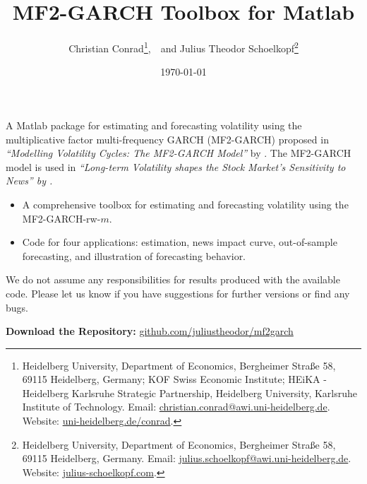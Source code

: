\documentclass[11pt,noindent]{article}
\newcommand{\1}{\mbox{$\mathrm{1\hspace*{-2.5pt}l}$\,}}   %
\begin{document}
\title{\vspace{-0ex}MF2-GARCH Toolbox for Matlab
}


\author{Christian Conrad\thanks{Heidelberg University, Department of Economics, Bergheimer Straße 58, 69115 Heidelberg, Germany; KOF Swiss Economic Institute; HEiKA - Heidelberg Karlsruhe Strategic Partnership, Heidelberg University, Karlsruhe Institute of Technology. Email: \href{mailto:christian.conrad@awi.uni-heidelberg.de}{christian.conrad@awi.uni-heidelberg.de}.  Website: \href{http://www.uni-heidelberg.de/conrad}{uni-heidelberg.de/conrad}.},~\ and Julius Theodor Schoelkopf\thanks{Heidelberg University, Department of Economics, Bergheimer Straße 58, 69115 Heidelberg, Germany. Email: \href{mailto:julius.schoelkopf@awi.uni-heidelberg.de}{julius.schoelkopf@awi.uni-heidelberg.de}. Website: \href{http://www.julius-schoelkopf.com}{julius-schoelkopf.com}.}}

\date{\today} 

\maketitle \noindent A Matlab package for estimating and forecasting volatility using the multiplicative factor multi-frequency GARCH (MF2-GARCH) proposed in \textit{``Modelling Volatility Cycles: The MF2-GARCH Model''} by \citet{ConradEngle2021}. The MF2-GARCH model is used in \textit{``Long-term Volatility shapes the Stock Market's Sensitivity to News'' by \citet{conradschoelkopftushteva:2025}.}%

\begin{itemize}
  \item A comprehensive toolbox for estimating and forecasting volatility using the MF2-GARCH-rw-$m$.
  \item Code for four applications: estimation, news impact curve, out-of-sample forecasting, and illustration of forecasting behavior.
\end{itemize}
We do not assume any responsibilities for results produced with the available code. Please let us know if you have suggestions for further versions or find any bugs.

\bigskip
\noindent\textbf{Download the Repository:} \href{https://github.com/juliustheodor/mf2garch}{github.com/juliustheodor/mf2garch}
\end{document}
